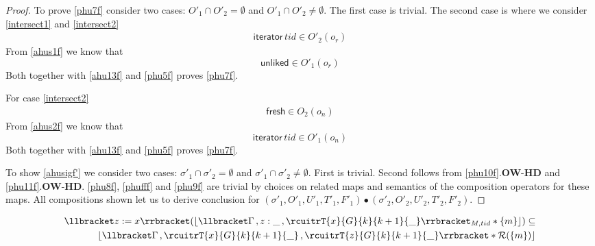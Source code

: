 \begin{proof}
To prove \ref{phu7f} consider two cases: $O'_1 \cap O'_2 = \emptyset$ and $O'_1 \cap O'_2 \neq \emptyset$. The first case is trivial. The second case is where we consider \ref{intersect1} and \ref{intersect2}
\begin{gather}\label{intersect1}
\textsf{iterator}\,tid \in O'_2(o_r)
\end{gather}
From \ref{ahus1f} we know that
\[\textsf{unliked} \in O'_1(o_r)\]
Both together with \ref{ahu13f} and \ref{phu5f} proves \ref{phu7f}.

For case \ref{intersect2}
\begin{gather}\label{intersect2}
\textsf{fresh} \in O_2(o_n)
\end{gather}
From \ref{ahus2f} we know that
\[\textsf{iterator}\, tid \in O'_1(o_n)\]
Both together with \ref{ahu13f} and \ref{phu5f} proves \ref{phu7f}.

To show \ref{ahusigf'} we consider two cases: $\sigma'_1 \cap \sigma'_2 = \emptyset$ and $\sigma'_1 \cap \sigma'_2 \neq \emptyset$. First is trivial. Second follows from \ref{phu10f}.\textbf{OW}-\textbf{HD} and \ref{phu11f}.\textbf{OW}-\textbf{HD}. \ref{phu8f}, \ref{phufff} and \ref{phu9f} are trivial by choices on related maps and semantics of the composition operators for these maps. All compositions shown  let us to derive conclusion for $(\sigma'_1, O'_1, U'_1, T'_1,F'_1) \bullet (\sigma'_2, O'_2, U'_2, T'_2,F'_2) $.
 \end{proof}
 \begin{lemma}
   \label{lemma:readstack}
\begin{align*}
  \llbracket z:=x \rrbracket (\lfloor \llbracket \Gamma\,, z:\_ \, ,\rcuitrT{x}{G}{k}{k+1}{\_} \rrbracket_{M,tid} * \{m\}\rfloor)  \subseteq \\
                                                              \lfloor \llbracket \Gamma\,, \rcuitrT{x}{G}{k}{k+1}{\_}\, , \rcuitrT{z}{G}{k}{k+1}{\_}  \rrbracket  * \mathcal{R}(\{m\})\rfloor
\end{align*}
 \end{lemma}
